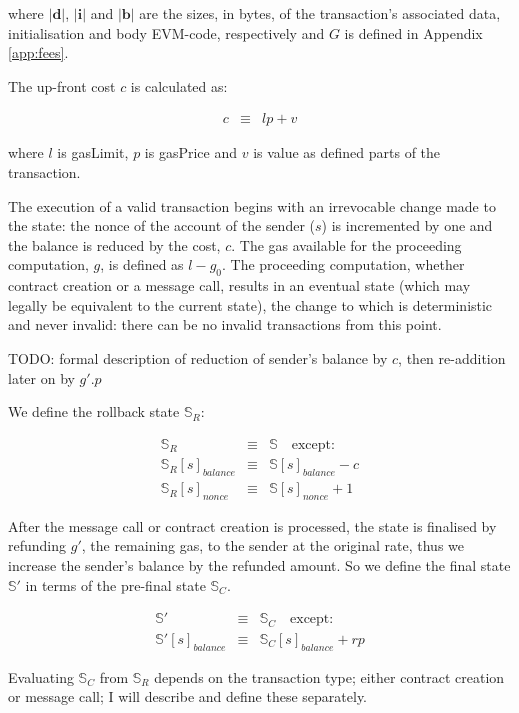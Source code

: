 \documentclass[9pt,oneside]{amsart}
\begin{document}
\begin{multicols}{2}
where $|\mathbf{d}|$, $|\mathbf{i}|$ and $|\mathbf{b}|$ are the sizes, in bytes, of the transaction's associated data, initialisation and body EVM-code, respectively and $G$ is defined in Appendix \ref{app:fees}.

The up-front cost $c$ is calculated as:

\begin{eqnarray}
c & \equiv & l p + v
\end{eqnarray}

where $l$ is gasLimit, $p$ is gasPrice and $v$ is value as defined parts of the transaction.

The execution of a valid transaction begins with an irrevocable change made to the state: the nonce of the account of the sender ($s$) is incremented by one and the balance is reduced by the cost, $c$. The gas available for the proceeding computation, $g$, is defined as $l - g_0$. The proceeding computation, whether contract creation or a message call, results in an eventual state (which may legally be equivalent to the current state), the change to which is deterministic and never invalid: there can be no invalid transactions from this point.

TODO: formal description of reduction of sender's balance by $c$, then re-addition later on by $g'.p$

We define the rollback state $\mathbb{S}_R$:

\begin{eqnarray}
\mathbb{S}_R & \equiv & \mathbb{S} \quad \text{except:} \\
\mathbb{S}_R[s]_{balance} & \equiv & \mathbb{S}[s]_{balance} - c \\
\mathbb{S}_R[s]_{nonce} & \equiv & \mathbb{S}[s]_{nonce} + 1
\end{eqnarray}

After the message call or contract creation is processed, the state is finalised by refunding $g'$, the remaining gas, to the sender at the original rate, thus we increase the sender's balance by the refunded amount. So we define the final state $\mathbb{S}'$ in terms of the pre-final state $\mathbb{S}_C$.

\begin{eqnarray}
\mathbb{S}' & \equiv & \mathbb{S}_C \quad \text{except:} \\
\mathbb{S}'[s]_{balance} & \equiv & \mathbb{S}_C[s]_{balance} + r p
\end{eqnarray}

Evaluating $\mathbb{S}_C$ from $\mathbb{S}_R$ depends on the transaction type; either contract creation or message call; I will describe and define these separately.




\end{multicols}
\end{document}
